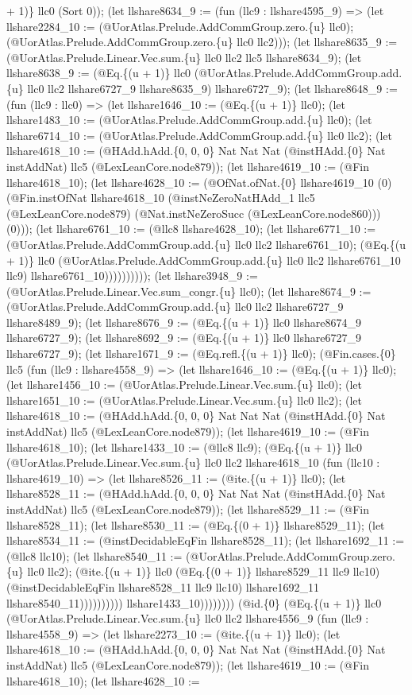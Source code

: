 \documentclass[11pt]{article}
\begin{document}
+ 1)\} llc0 (Sort 0)); (let llshare8634\_9 := (fun (llc9 : llshare4595\_9) => (let llshare2284\_10 := (@UorAtlas.Prelude.AddCommGroup.zero.\{u\} llc0); (@UorAtlas.Prelude.AddCommGroup.zero.\{u\} llc0 llc2))); (let llshare8635\_9 := (@UorAtlas.Prelude.Linear.Vec.sum.\{u\} llc0 llc2 llc5 llshare8634\_9); (let llshare8638\_9 := (@Eq.\{(u + 1)\} llc0 (@UorAtlas.Prelude.AddCommGroup.add.\{u\} llc0 llc2 llshare6727\_9 llshare8635\_9) llshare6727\_9); (let llshare8648\_9 := (fun (llc9 : llc0) => (let llshare1646\_10 := (@Eq.\{(u + 1)\} llc0); (let llshare1483\_10 := (@UorAtlas.Prelude.AddCommGroup.add.\{u\} llc0); (let llshare6714\_10 := (@UorAtlas.Prelude.AddCommGroup.add.\{u\} llc0 llc2); (let llshare4618\_10 := (@HAdd.hAdd.\{0, 0, 0\} Nat Nat Nat (@instHAdd.\{0\} Nat instAddNat) llc5 (@LexLeanCore.node879)); (let llshare4619\_10 := (@Fin llshare4618\_10); (let llshare4628\_10 := (@OfNat.ofNat.\{0\} llshare4619\_10 (0) (@Fin.instOfNat llshare4618\_10 (@instNeZeroNatHAdd\_1 llc5 (@LexLeanCore.node879) (@Nat.instNeZeroSucc (@LexLeanCore.node860))) (0))); (let llshare6761\_10 := (@llc8 llshare4628\_10); (let llshare6771\_10 := (@UorAtlas.Prelude.AddCommGroup.add.\{u\} llc0 llc2 llshare6761\_10); (@Eq.\{(u + 1)\} llc0 (@UorAtlas.Prelude.AddCommGroup.add.\{u\} llc0 llc2 llshare6761\_10 llc9) llshare6761\_10)))))))))); (let llshare3948\_9 := (@UorAtlas.Prelude.Linear.Vec.sum\_congr.\{u\} llc0); (let llshare8674\_9 := (@UorAtlas.Prelude.AddCommGroup.add.\{u\} llc0 llc2 llshare6727\_9 llshare8489\_9); (let llshare8676\_9 := (@Eq.\{(u + 1)\} llc0 llshare8674\_9 llshare6727\_9); (let llshare8692\_9 := (@Eq.\{(u + 1)\} llc0 llshare6727\_9 llshare6727\_9); (let llshare1671\_9 := (@Eq.refl.\{(u + 1)\} llc0); (@Fin.cases.\{0\} llc5 (fun (llc9 : llshare4558\_9) => (let llshare1646\_10 := (@Eq.\{(u + 1)\} llc0); (let llshare1456\_10 := (@UorAtlas.Prelude.Linear.Vec.sum.\{u\} llc0); (let llshare1651\_10 := (@UorAtlas.Prelude.Linear.Vec.sum.\{u\} llc0 llc2); (let llshare4618\_10 := (@HAdd.hAdd.\{0, 0, 0\} Nat Nat Nat (@instHAdd.\{0\} Nat instAddNat) llc5 (@LexLeanCore.node879)); (let llshare4619\_10 := (@Fin llshare4618\_10); (let llshare1433\_10 := (@llc8 llc9); (@Eq.\{(u + 1)\} llc0 (@UorAtlas.Prelude.Linear.Vec.sum.\{u\} llc0 llc2 llshare4618\_10 (fun (llc10 : llshare4619\_10) => (let llshare8526\_11 := (@ite.\{(u + 1)\} llc0); (let llshare8528\_11 := (@HAdd.hAdd.\{0, 0, 0\} Nat Nat Nat (@instHAdd.\{0\} Nat instAddNat) llc5 (@LexLeanCore.node879)); (let llshare8529\_11 := (@Fin llshare8528\_11); (let llshare8530\_11 := (@Eq.\{(0 + 1)\} llshare8529\_11); (let llshare8534\_11 := (@instDecidableEqFin llshare8528\_11); (let llshare1692\_11 := (@llc8 llc10); (let llshare8540\_11 := (@UorAtlas.Prelude.AddCommGroup.zero.\{u\} llc0 llc2); (@ite.\{(u + 1)\} llc0 (@Eq.\{(0 + 1)\} llshare8529\_11 llc9 llc10) (@instDecidableEqFin llshare8528\_11 llc9 llc10) llshare1692\_11 llshare8540\_11)))))))))) llshare1433\_10)))))))) (@id.\{0\} (@Eq.\{(u + 1)\} llc0 (@UorAtlas.Prelude.Linear.Vec.sum.\{u\} llc0 llc2 llshare4556\_9 (fun (llc9 : llshare4558\_9) => (let llshare2273\_10 := (@ite.\{(u + 1)\} llc0); (let llshare4618\_10 := (@HAdd.hAdd.\{0, 0, 0\} Nat Nat Nat (@instHAdd.\{0\} Nat instAddNat) llc5 (@LexLeanCore.node879)); (let llshare4619\_10 := (@Fin llshare4618\_10); (let llshare4628\_10 := 
\end{document}
